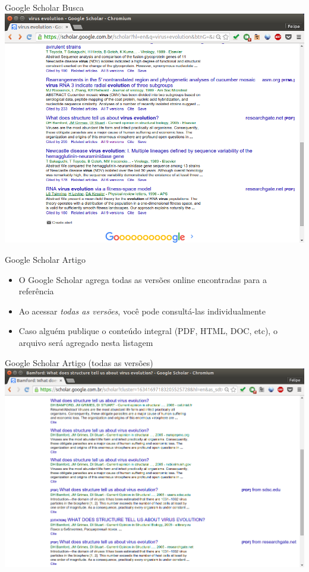\documentclass{beamer}
\begin{document}
\begin{frame}{Google Scholar Busca}
  \centering
  \includegraphics[height=.85\textheight]{Busca/scholar-busca2}
\end{frame}

\begin{frame}{Google Scholar Artigo}
  \begin{itemize}
    \footnotesize
  \item O Google Scholar agrega todas as versões online encontradas
    para a referência
  \item Ao acessar {\em todas as versões}, você pode consultá-las
    individualmente
  \item Caso alguém publique o conteúdo integral (PDF, HTML, DOC,
    etc), o arquivo será agregado nesta listagem
  \end{itemize}
\end{frame}

\begin{frame}{Google Scholar Artigo (todas as versões)}
  \centering
  \includegraphics[height=.85\textheight]{Busca/scholar-paper}
\end{frame}
\end{document}
